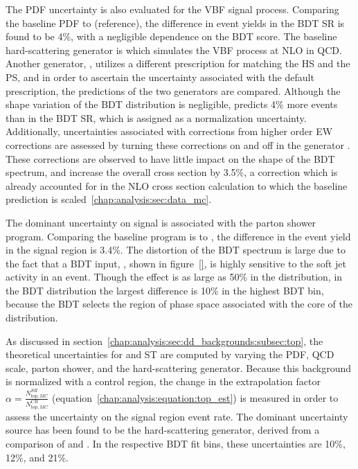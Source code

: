 The PDF uncertainty is also evaluated for the VBF signal process. 
Comparing the baseline PDF \ctten to \nnpdf (reference), the
difference in event yields in the BDT SR is found to be 4\%, with a
negligible dependence on the BDT score. The baseline hard-scattering
generator is \POWHEG which simulates the VBF process at NLO in
QCD. Another generator, \aMCATNLO, utilizes a different prescription
for matching the HS and the PS, and in order to ascertain the
uncertainty associated with the default prescription, the predictions
of the two generators are compared. Although the shape variation of
the BDT distribution is negligible, \aMCATNLO predicts 4\% more events
than \POWHEG in the BDT SR, which is assigned as a normalization
uncertainty. Additionally, uncertainties associated with corrections
from higher order EW corrections are assessed by turning these
corrections on and off in the generator \VBFNLO. These corrections are
observed to have little impact on the shape of the BDT spectrum, and
increase the overall cross section by 3.5\%, a correction which is
already accounted for in the NLO cross section calculation to which
the baseline prediction is scaled~\ref{chap:analysis:sec:data_mc}.

The dominant uncertainty on signal is associated with the parton
shower program. Comparing the baseline program \PYTHIA is to \HERWIG,
the difference in the event yield in the signal region is 3.4\%. The
distortion of the BDT spectrum is large due to the fact that a BDT
input, \pttot, shown in figure~\ref{}, is highly sensitive to the soft
jet activity in an event. Though the effect is as large as 50\% in
the \pttot distribution, in the BDT distribution the largest
difference is 10\% in the highest BDT bin, because the BDT selects the
region of phase space associated with the core of the \pttot
distribution. 

As discussed in
section~\ref{chap:analysis:sec:dd_backgrounds:subsec:top}, the
theoretical uncertainties
for \ttbar and ST are computed by varying the PDF, QCD scale, parton
shower, and the hard-scattering generator. Because this background is
normalized with a control region, the change in the extrapolation
factor $\alpha = \frac{N_{top,MC}^{SR}}{N_{top,MC}^{CR}}$
(equation~\ref{chap:analysis:equation:top_est}) is measured in order to
assess the uncertainty on the signal region event rate. The dominant
uncertainty source has been found to be the hard-scattering generator,
derived from a comparison of \MCATNLO and \ALPGEN. In the respective
BDT fit bins, these uncertainties are 10\%, 12\%, and 21\%.

